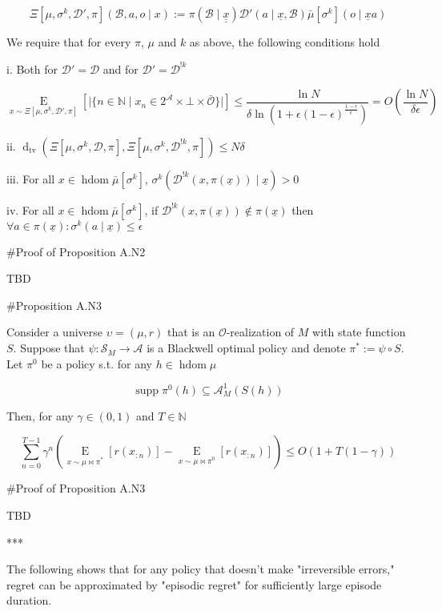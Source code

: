\documentclass[a4paper]{article}
\DeclareMathOperator{\Supp}{supp}
\newcommand{\E}[1]{\underset{#1}{\operatorname{E}}}
\newcommand{\Dtv}{\operatorname{d}_{\text{tv}}}
\newcommand{\Nats}{\mathbb{N}}
\newcommand{\Abs}[1]{\lvert #1 \rvert}
\newcommand{\Ob}{\mathcal{O}}
\newcommand{\A}{\mathcal{A}}
\newcommand{\St}{\mathcal{S}}
\DeclareMathOperator{\HD}{hdom}
\newcommand{\D}{\mathcal{D}}
\newcommand{\B}{\mathcal{B}}
\begin{document}
$$\Xi\left[\mu,\sigma^k,\D',\pi\right]\left(\B,a,o \mid x\right):=\pi\left(\B \mid \underline{\underline{x}}\right)\D'\left(a \mid \underline{x},\B\right) \bar{\mu}[\sigma^k]\left(o \mid \underline{x}a\right)$$

We require that for every $\pi$, $\mu$ and $k$ as above, the following conditions hold

i. Both for $\D'=\D$ and for $\D'=\D^{!k}$

$$\E{x \sim\Xi\left[\mu,\sigma^k,\D',\pi\right]}\left[\Abs{\{n \in \Nats \mid x_n \in 2^\A \times \bot \times \bar{\Ob}\}}\right] \leq \frac{\ln N}{\delta \ln\left(1 + \epsilon(1-\epsilon)^{\frac{1-\epsilon}{\epsilon}}\right)}=O\left(\frac{\ln N}{\delta \epsilon}\right)$$

ii. $\Dtv\left(\Xi\left[\mu,\sigma^k,\D,\pi\right],\Xi\left[\mu,\sigma^k,\D^{!k},\pi\right]\right) \leq N\delta$

iii. For all $x \in \HD{\bar{\mu}[\sigma^k]}$, $\sigma^k\left(\D^{!k}\left(x,\pi\left(\underline{x}\right)\right) \mid \underline{x}\right) > 0$

iv. For all $x \in \HD{\bar{\mu}[\sigma^k]}$, if $\D^{!k}\left(x,\pi\left(\underline{x}\right)\right) \not\in \pi\left(\underline{x}\right)$ then $\forall a \in \pi\left(\underline{x}\right): \sigma^k\left(a \mid \underline{x}\right) \leq \epsilon$

\#Proof of Proposition A.N2

TBD

\#Proposition A.N3

Consider a universe $\upsilon=(\mu,r)$ that is an $\Ob$-realization of $M$ with state function $S$. Suppose that $\psi: \St_M \rightarrow \A$ is a Blackwell optimal policy and denote $\pi^* := \psi \circ S$. Let $\pi^0$ be a policy s.t. for any $h \in \HD{\mu}$

$$\Supp \pi^0(h) \subseteq \A_M^1\left(S(h)\right)$$

Then, for any $\gamma\in(0,1)$ and $T \in \Nats$

$$\sum_{n=0}^{T-1} \gamma^n \left(\E{x \sim \mu\bowtie\pi^*}\left[r\left(x_{:n}\right)\right]-\E{x \sim \mu\bowtie\pi^0}\left[r\left(x_{:n}\right)\right]\right) \leq O\left(1+T\left(1-\gamma\right)\right)$$

\#Proof of Proposition A.N3

TBD

***

The following shows that for any policy that doesn't make "irreversible errors," regret can be approximated by "episodic regret" for sufficiently large episode duration.
\end{document}

